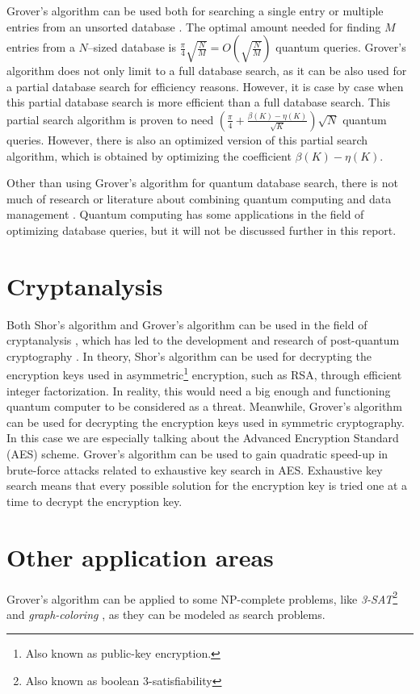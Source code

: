 \documentclass[english,oneside,openright]{UH_DS_report}
\begin{document}
Grover's algorithm can be used both for searching a single entry or multiple entries from an unsorted database \cite{giri2017review}. The optimal amount needed for finding $M$ entries from a $N$--sized database is $\frac{\pi}{4}\sqrt{\frac{N}{M}} = O(\sqrt{\frac{N}{M}})$ quantum queries. Grover's algorithm does not only limit to a full database search, as it can be also used for a partial database search for efficiency reasons. However, it is case by case when this partial database search is more efficient than a full database search. This partial search algorithm is proven to need $(\frac{\pi}{4}+\frac{\beta (K) - \eta (K)}{\sqrt{K}})\sqrt{N}$ quantum queries. However, there is also an optimized version of this partial search algorithm, which is obtained by optimizing the coefficient $\beta (K) - \eta (K)$.

Other than using Grover's algorithm for quantum database search, there is not much of research or literature about combining quantum computing and data management \cite{qcdb}. Quantum computing has some applications in the field of optimizing database queries, but it will not be discussed further in this report.

\section{Cryptanalysis}

Both Shor's algorithm and Grover's algorithm can be used in the field of cryptanalysis \cite{grassl2016applying}, which has led to the development and research of post-quantum cryptography \cite{qcdb}. In theory, Shor's algorithm can be used for decrypting the encryption keys used in asymmetric\footnote{Also known as public-key encryption.} encryption, such as RSA, through efficient integer factorization. In reality, this would need a big enough and functioning quantum computer to be considered as a threat. Meanwhile, Grover's algorithm can be used for decrypting the encryption keys used in symmetric cryptography. In this case we are especially talking about the Advanced Encryption Standard (AES) scheme. Grover's algorithm can be used to gain quadratic speed-up in brute-force attacks related to exhaustive key search in AES. Exhaustive key search means that every possible solution for the encryption key is tried one at a time to decrypt the encryption key.

\section{Other application areas}
Grover's algorithm can be applied to some NP-complete problems, like \emph{3-SAT}\footnote{Also known as boolean 3-satisfiability} \cite{ambainis2004quantum} and \emph{graph-coloring} \cite{introtoqc}, as they can be modeled as search problems.
\end{document}
